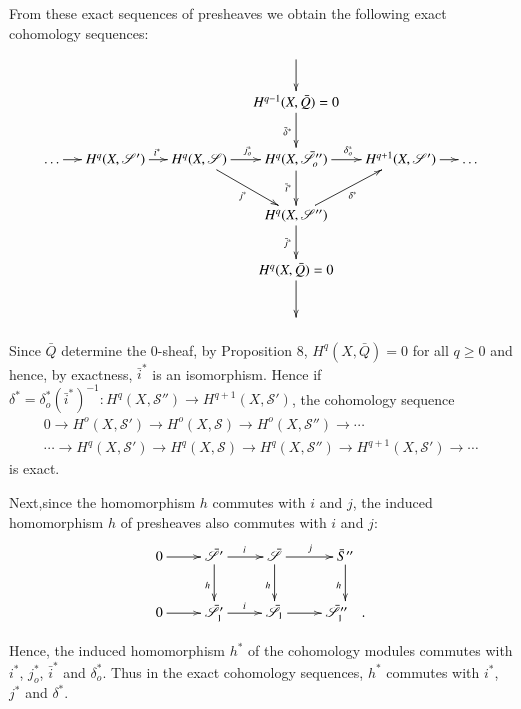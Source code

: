 From  these exact sequences of presheaves we obtain the following
exact cohomology sequences: 
{\fontsize{9}{11}\selectfont
\[
\xymatrix@C=0.45cm{
& & & \ar[d] & & \\
& & & H^{q-1} (X,\bar{Q}) = 0 \ar[d]_{\bar{\delta}^{\ast}} & & \\
\ldots \ar[r] & H^q(X,\mathscr{S}') \ar[r]^{i^{\ast}} &
H^q(X,\mathscr{S}) \ar[r]^{j^{\ast}_o} \ar[dr]_{j^{\ast}}&
H^{q}(X,\mathscr{\bar{S}}''_o) 
\ar[r]^{\delta^{\ast}_o} \ar[d]_{\bar{i}^{\ast}}&
H^{q+1}(X,\mathscr{S}') \ar[r] & \ldots\\
& & & H^q(X,\mathscr{S}'') \ar[ur]_{\delta^{\ast}}
\ar[d]_{\bar{j}^{\ast}} & & \\ 
& & & H^q(X,\bar{Q})=0 \ar[d]  & & \\
& & & & & 
 }
\]}\relax

Since $\bar{Q}$ determine the 0-sheaf, by Proposition 8, $H^q(X,
\bar{Q})=0$ for all $q \ge 0$ and hence, by exactness, $\bar{i}^*$ is
an isomorphism. Hence if $\delta^*= \delta^*_o(\bar{i}^*)^{-1}: H^q(X,
\mathscr{S}'') \to H^{q+1}(X, \mathscr{S}')$, the cohomology sequence 
\begin{gather*}
0 \to  H^o(X,\mathscr{S}')  \to  H^o (X,\mathscr{S}) \to  H^o(X,
\mathscr{S}'') \to \cdots\\ 
\cdots \to  H^q(X,\mathscr{S}') \to H^q(X,\mathscr{S}) \to
H^q(X,\mathscr{S}'') \to H^{q+1}(X,\mathscr{S}') \to \cdots  
\end{gather*}
is exact.

Next,\pageoriginale since the homomorphism $h$ commutes with $i$ and
$j$, the induced homomorphism $h$ of presheaves also commutes with
$i$ and $j$:  
\[
\xymatrix{
0\ar[r] & \bar{\mathscr{S}}'\ar[r]^i\ar[d]_h &
\bar{\mathscr{S}}\ar[r]^j\ar[d]_h & \bar{S}''\ar[d]_h\\
0 \ar[r] & \bar{\mathscr{S}}'_1 \ar[r]^i & \bar{\mathscr{S}}_1 \ar[r]
& \bar{\mathscr{S}}''_1 \quad .
}
\]

Hence, the induced homomorphism $h^*$ of the cohomology modules
commutes with $i^*$, $j^*_o$, $\bar{i}^*$ and $\delta^*_o$. Thus in the
exact cohomology sequences, $h^*$ commutes with $i^*$, $j^*$ and
$\delta^*$. 

